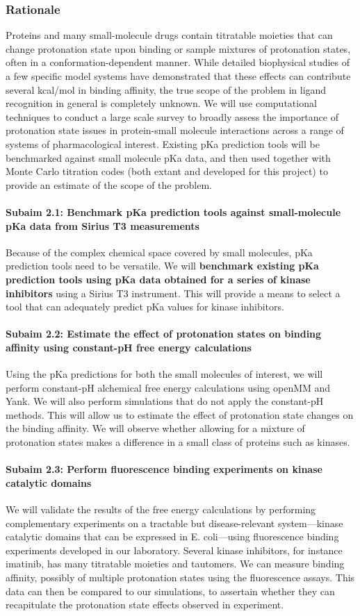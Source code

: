 \documentclass[10pt]{article}
\newcommand{\subsubsubsection}[1]{\paragraph*{#1}}
\begin{document}
\subsubsection*{Rationale}
Proteins and many small-molecule drugs contain titratable moieties that can change protonation state upon binding or sample mixtures of protonation states, often in a conformation-dependent manner.
While detailed biophysical studies of a few specific model systems have demonstrated that these effects can contribute several kcal/mol in binding affinity, the true scope of the problem in ligand recognition in general is completely unknown.
We will use computational techniques to conduct a large scale survey to broadly assess the importance of protonation state issues in protein-small molecule interactions across a range of systems of pharmacological interest.
Existing pKa prediction tools will be benchmarked against small molecule pKa data, and then used together with Monte Carlo titration codes (both extant and developed for this project) to provide an estimate of the scope of the problem.

\subsubsubsection{Subaim 2.1: Benchmark pKa prediction tools against small-molecule pKa data from Sirius T3 measurements}
Because of the complex chemical space covered by small molecules, pKa prediction tools need to be versatile. We will \textbf{benchmark existing pKa prediction tools using pKa data obtained for a series of kinase inhibitors} using a Sirius T3 instrument. This will provide a means to select a tool that can adequately predict pKa values for kinase inhibitors.


\subsubsubsection{Subaim 2.2: Estimate the effect of protonation states on binding affinity using constant-pH free energy calculations}
Using the pKa predictions for both the small molecules of interest, we will perform constant-pH alchemical free energy calculations\cite{Mongan2004a} using openMM\cite{Eastman2013a} and Yank. We will also perform simulations that do not apply the constant-pH methods. This will allow us to estimate the effect of protonation state changes on the binding affinity. We will observe whether allowing for a mixture of protonation states makes a difference in a small class of proteins such as kinases.

\subsubsubsection{Subaim 2.3: Perform fluorescence binding experiments on kinase catalytic domains}
We will validate the results of the free energy calculations by performing complementary experiments on a tractable but disease-relevant system---kinase catalytic domains that can be expressed in E. coli---using fluorescence binding experiments developed in our laboratory. Several kinase inhibitors, for instance imatinib, has many titratable moieties and tautomers. We can measure binding affinity, possibly of multiple protonation states using the fluorescence assays. This data can then be compared to our simulations, to assertain whether they can recapitulate the protonation state effects observed in experiment.
\end{document}
